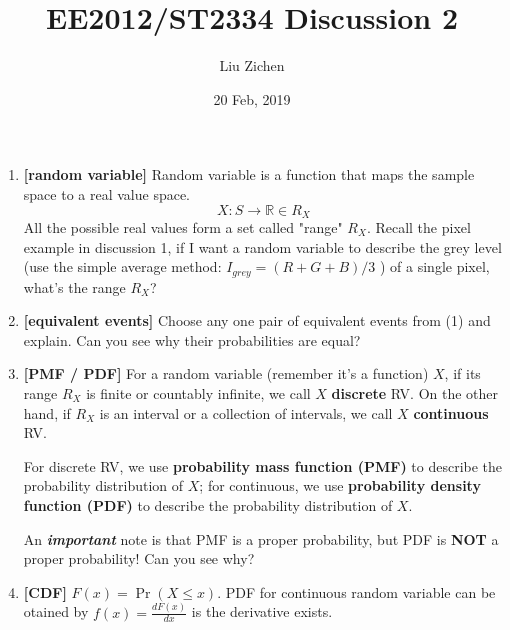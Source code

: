 \documentclass[a4paper]{article}
\title{EE2012/ST2334 Discussion 2}
\author{Liu Zichen}
\date{20 Feb, 2019}
\begin{document}
\maketitle

\begin{enumerate}

\item
\textbf{[random variable]}
Random variable is a function that maps the sample space to a real value space. 
\[X : S \rightarrow \mathbb { R } \in R _ {X}\]
All the possible real values form a set called "range" $R_{X}$.
Recall the pixel example in discussion 1, if I want a random variable to describe the grey level (use the simple average method: $I _ {grey} = ( R + G + B ) / 3$ ) of a single pixel, what's the range $R _ {X}$?

\item
\textbf{[equivalent events]}
Choose any one pair of equivalent events from (1) and explain. Can you see why their probabilities are equal? 

\item
\textbf{[PMF / PDF]}
For a random variable (remember it's a function) $X$, if its range $R _ {X}$ is finite or countably infinite, we call $X$ \textbf{discrete} RV. On the other hand, if $R_{X}$ is an interval or a collection of intervals, we call $X$ \textbf{continuous} RV.

For discrete RV, we use \textbf{probability mass function (PMF)} to describe the probability distribution of $X$; for continuous, we use \textbf{probability density function (PDF)} to describe the probability distribution of $X$. 

An \textbf{\textit{important}} note is that PMF is a proper probability, but PDF is \textbf{NOT} a proper probability! Can you see why?

\item
\textbf{[CDF]}
$F ( x ) = \operatorname { Pr } ( X \leq x )$. PDF for continuous random variable can be otained by $f ( x ) = \frac { d F ( x ) } { d x }$ is the derivative exists.


\end{enumerate}
\end{document}
